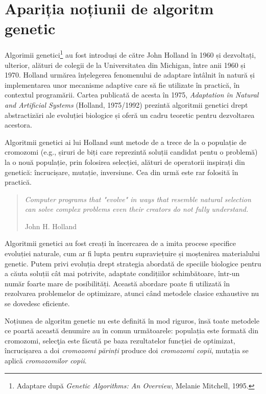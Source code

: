 \section{Apariția noțiunii de algoritm genetic} 
 
Algorimii genetici\footnote{Adaptare după \textit{Genetic Algorithms: An Overview}, Melanie Mitchell, 1995.} au fost introduși de către John Holland în 1960 și dezvoltați, ulterior, alături de colegii de la Universitatea din Michigan, între anii 1960 și 1970. Holland urmărea înțelegerea fenomenului de adaptare întâlnit în natură și implementarea unor mecanisme adaptive care să fie utilizate în practică, în contextul programării. Cartea publicată de acesta în 1975, \textit{Adaptation în Natural and Artificial Systems} (Holland, 1975/1992) prezintă algoritmii genetici drept abstractizări ale evoluției biologice și oferă un cadru teoretic pentru dezvoltarea acestora.

Algoritmii genetici ai lui Holland sunt metode de a trece de la o populație de cromozomi (e.g., șiruri de biți care reprezintă soluții candidat pentu o problemă) la o nouă populație, prin folosirea selecției, alături de operatorii inspirați din genetică: încrucișare, mutație, inversiune. Cea din urmă este rar folosită în practică.

\begin{quote} 
	\textit{Computer programs that "evolve" in ways that resemble natural selection can solve complex problems even their creators do not fully understand.}
	\begin{flushright}
		John H. Holland 
	\end{flushright}
\end{quote}

\clearpage

Algoritmii genetici au fost creați în încercarea de a imita procese specifice evoluției naturale, cum ar fi lupta pentru supraviețuire și moștenirea materialului genetic. Putem privi evoluția drept strategia abordată de speciile biologice pentru a căuta soluții cât mai potrivite, adaptate condițiilor schimbătoare, într-un număr foarte mare de posibilități. Această abordare poate fi utilizată în rezolvarea problemelor de optimizare, atunci când metodele clasice exhaustive nu se dovedesc eficiente. 
 
Noțiunea de algoritm genetic nu este definită în mod riguros\cite{introduction_by_melanie_mitchell}, însă toate metodele ce poartă această denumire au în comun următoarele: populația este formată din cromozomi, selecţia este făcută pe baza rezultatelor funcției de optimizat, încrucișarea a doi \textit{cromozomi părinți} produce doi \textit{cromozomi copii}, mutația se aplică \textit{cromozomilor copii}. 

